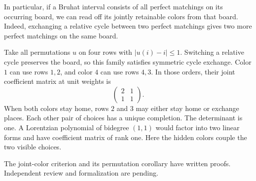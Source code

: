In particular, if a Bruhat interval consists of all perfect matchings
on its occurring board, we can read off its jointly retainable colors
from that board. Indeed, exchanging a relative cycle between two
perfect matchings gives two more perfect matchings on the same board.

\begin{example}
Take all permutations $u$ on four rows with $|u(i)-i|\leq1$. Switching
a relative cycle preserves the board, so this family satisfies symmetric
cycle exchange. Color $1$ can use rows $1,2$, and color $4$ can use rows
$4,3$. In those orders, their joint coefficient matrix at unit weights is
\[
 \begin{pmatrix}2&1\\1&1\end{pmatrix}.
\]
When both colors stay home, rows $2$ and $3$ may either stay home or
exchange places. Each other pair of choices has a unique completion.
The determinant is one. A Lorentzian polynomial of bidegree $(1,1)$
would factor into two linear forms and have coefficient matrix of rank
one. Here the hidden colors couple the two visible choices.
\end{example}

\begin{remark}
The joint-color criterion and its permutation corollary have written
proofs. Independent review and formalization are pending.
\end{remark}
